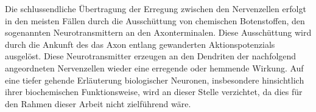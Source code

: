 Die schlussendliche Übertragung der Erregung zwischen den Nervenzellen erfolgt in den meisten Fällen durch die Ausschüttung von chemischen Botenstoffen, den sogenannten Neurotransmittern an den Axonterminalen. Diese Ausschüttung wird durch die Ankunft des das Axon entlang gewanderten Aktionspotenzials ausgelöst. Diese Neurotransmitter erzeugen an den Dendriten der nachfolgend angeordneten Nervenzellen wieder eine erregende oder hemmende Wirkung.\newline
Auf eine tiefer gehende Erläuterung biologischer Neuronen, insbesondere hinsichtlich ihrer biochemischen Funktionsweise, wird an dieser Stelle verzichtet, da dies für den Rahmen dieser Arbeit nicht zielführend wäre. %
